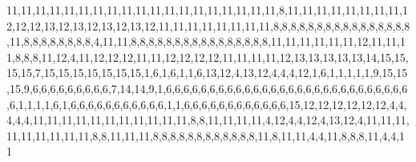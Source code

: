 11,11,11,11,11,11,11,11,11,11,11,11,11,11,11,11,11,11,11,8,11,11,11,11,11,11,11,11,12,12,12,13,12,13,12,13,12,13,12,11,11,11,11,11,11,11,11,8,8,8,8,8,8,8,8,8,8,8,8,8,8,8,8,11,8,8,8,8,8,8,8,8,4,11,11,8,8,8,8,8,8,8,8,8,8,8,8,8,8,8,8,11,11,11,11,11,11,12,11,11,11,8,8,8,11,12,4,11,12,12,12,11,11,12,12,12,12,11,11,11,11,12,13,13,13,13,13,14,15,15,15,15,7,15,15,15,15,15,15,15,1,6,1,6,1,1,6,13,12,4,13,12,4,4,4,12,1,6,1,1,1,1,1,9,15,15,15,9,6,6,6,6,6,6,6,6,6,7,14,14,9,1,6,6,6,6,6,6,6,6,6,6,6,6,6,6,6,6,6,6,6,6,6,6,6,6,6,6,6,6,6,1,1,1,1,6,1,6,6,6,6,6,6,6,6,6,6,6,1,1,6,6,6,6,6,6,6,6,6,6,6,6,15,12,12,12,12,12,12,4,4,4,4,4,11,11,11,11,11,11,11,11,11,11,11,8,8,11,11,11,11,4,12,4,4,12,4,13,12,4,11,11,11,11,11,11,11,11,11,8,8,11,11,11,8,8,8,8,8,8,8,8,8,8,8,8,11,8,11,11,4,4,11,8,8,8,11,4,4,11
